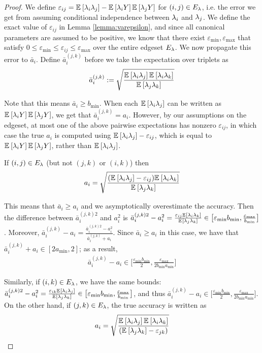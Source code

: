 \begin{proof}
We define $\varepsilon_{ij} = \mathbb{E}_{}\left[\lambda_i \lambda_j\right] - \mathbb{E}_{}\left[\lambda_i Y\right] \mathbb{E}_{}\left[\lambda_j Y\right]$ for $(i, j) \in E_{\lambda}$, i.e. the error we get from assuming conditional independence between $\lambda_i$ and $\lambda_j$. We define the exact value of $\varepsilon_{ij}$ in Lemma \ref{lemma:varepsilon}, and since all canonical parameters are assumed to be positive, we know that there exist $\varepsilon_{\min}, \varepsilon_{\max}$ that satisfy $0 \le \varepsilon_{\min} \le \varepsilon_{ij} \le \varepsilon_{\max}$ over the entire edgeset $E_{\lambda}$. We now propagate this error to $\bar{a}_i$. Define $\bar{a}_i^{(j, k)}$ before we take the expectation over triplets as
\begin{align*}
\bar{a}_i^{(j, k)} := \sqrt{\frac{\mathbb{E}_{}\left[\lambda_i \lambda_j\right] \mathbb{E}_{}\left[\lambda_i \lambda_k\right]}{\mathbb{E}_{}\left[\lambda_j \lambda_k\right]}} 
\end{align*}

Note that this means $\bar{a}_i \ge b_{\min}$. When each $\mathbb{E}_{}\left[\lambda_i \lambda_j\right]$ can be written as $\mathbb{E}_{}\left[\lambda_i Y\right] \mathbb{E}_{}\left[\lambda_j Y\right]$, we get that $\bar{a}_i^{(j, k)} = a_i$. However, by our assumptions on the edgeset, at most one of the above pairwise expectations has nonzero $\varepsilon_{ij}$, in which case the true $a_i$ is computed using $\mathbb{E}_{}\left[\lambda_i \lambda_j\right] - \varepsilon_{ij}$, which is equal to $\mathbb{E}_{}\left[\lambda_i Y\right] \mathbb{E}_{}\left[\lambda_j Y\right]$, rather than $\mathbb{E}_{}\left[\lambda_i \lambda_j\right]$.

If $(i, j) \in E_{\lambda}$ (but not $(j, k)$ or $(i, k)$) then
\begin{align*}
a_i = \sqrt{\frac{(\mathbb{E}_{}\left[\lambda_i \lambda_j\right] - \varepsilon_{ij}) \mathbb{E}_{}\left[\lambda_i \lambda_k\right]}{\mathbb{E}_{}\left[\lambda_j \lambda_k\right]}}
\end{align*}

This means that $\bar{a}_i \ge a_i$ and we asymptotically overestimate the accuracy. Then the difference  between $\bar{a}_i^{(j,k) 2}$ and $a_i^2$ is
$\bar{a}_i^{(j, k) 2} - a_i^2 = \frac{\varepsilon_{ij} \mathbb{E}_{}\left[\lambda_i \lambda_k\right]}{\mathbb{E}_{}\left[\lambda_j \lambda_k\right]} \in \big[\varepsilon_{\min} b_{\min}, \frac{\varepsilon_{\max}}{b_{\min}}\big]$. Moreover, $\bar{a}_i^{(j, k)} - a_i = \frac{\bar{a}_i^{(j, k) 2} - a_i^2}{\bar{a}_i^{(j, k)} + a_i}$. Since $\bar{a}_i \ge a_i$ in this case, we have that $\bar{a}_i^{(j, k)} + a_i \in [2a_{\min}, 2]$; as a result,
\begin{align}
\bar{a}_i^{(j, k)} - a_i \in \big[ \frac{\varepsilon_{\min} b_{\min}}{2}, \frac{\varepsilon_{\max}}{2 b_{\min} a_{\min}}\big] \label{eq:acc_diff_ij}
\end{align}

Similarly, if $(i,k) \in E_{\lambda}$, we have the same bounds: $\bar{a}_i^{(j, k)2} - a_i^2 = \frac{\varepsilon_{ik} \mathbb{E}_{}\left[\lambda_i \lambda_j\right]}{\mathbb{E}_{}\left[\lambda_j \lambda_k\right]} \in \big[\varepsilon_{\min} b_{\min}, \frac{\varepsilon_{\max}}{b_{\min}}\big]$, and thus $\bar{a}_i^{(j, k)} - a_i \in \big[ \frac{\varepsilon_{\min} b_{\min}}{2}, \frac{\varepsilon_{\max}}{2 b_{\min} a_{\min}}\big]$. On the other hand, if $(j, k) \in E_{\lambda}$, the true accuracy is written as
\begin{align*}
a_i = \sqrt{\frac{\mathbb{E}_{}\left[\lambda_i \lambda_j\right] \mathbb{E}_{}\left[\lambda_i \lambda_k\right]}{(\mathbb{E}_{}\left[\lambda_j \lambda_k\right]- \varepsilon_{jk})} }
\end{align*}


\end{proof}

